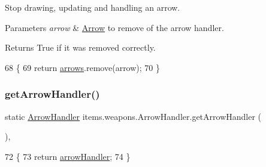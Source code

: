 Stop drawing, updating and handling an arrow.


\begin{DoxyParams}{Parameters}
{\em arrow} & \mbox{\hyperlink{classitems_1_1weapons_1_1_arrow}{Arrow}} to remove of the arrow handler. \\
\hline
\end{DoxyParams}
\begin{DoxyReturn}{Returns}
True if it was removed correctly. 
\end{DoxyReturn}

\begin{DoxyCode}
68                                             \{
69         \textcolor{keywordflow}{return} \mbox{\hyperlink{classitems_1_1weapons_1_1_arrow_handler_a7038dd7e7fa3db85bcddf0d8601d4271}{arrows}}.remove(arrow);
70     \}
\end{DoxyCode}
\mbox{\label{classitems_1_1weapons_1_1_arrow_handler_a67870bc30237b05a43008c330ec748ce}} 
\subsubsection{\texorpdfstring{get\+Arrow\+Handler()}{getArrowHandler()}}
{\footnotesize\ttfamily static \mbox{\hyperlink{classitems_1_1weapons_1_1_arrow_handler}{Arrow\+Handler}} items.\+weapons.\+Arrow\+Handler.\+get\+Arrow\+Handler (\begin{DoxyParamCaption}{ }\end{DoxyParamCaption})\hspace{0.3cm}{\ttfamily [inline]}, {\ttfamily [static]}}


\begin{DoxyCode}
72                                                  \{
73         \textcolor{keywordflow}{return} \mbox{\hyperlink{classitems_1_1weapons_1_1_arrow_handler_a1d4f905a340ec4bdccbefeb1a8cac834}{arrowHandler}};
74     \}
\end{DoxyCode}
\mbox{\label{classitems_1_1weapons_1_1_arrow_handler_abe0324e6596b718769e45b8165c25673}} 
